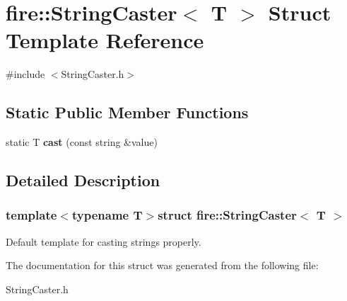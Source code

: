 \hypertarget{a00040}{}\section{fire\+:\+:String\+Caster$<$ T $>$ Struct Template Reference}
\label{a00040}


{\ttfamily \#include $<$String\+Caster.\+h$>$}

\subsection*{Static Public Member Functions}
\begin{DoxyCompactItemize}
\item 
\hypertarget{a00040_a2f87754c1c9d5cfe64acebbaafddbbae}{}static T {\bfseries cast} (const string \&value)\label{a00040_a2f87754c1c9d5cfe64acebbaafddbbae}

\end{DoxyCompactItemize}


\subsection{Detailed Description}
\subsubsection*{template$<$typename T$>$struct fire\+::\+String\+Caster$<$ T $>$}

Default template for casting strings properly. 

The documentation for this struct was generated from the following file\+:\begin{DoxyCompactItemize}
\item 
String\+Caster.\+h\end{DoxyCompactItemize}
